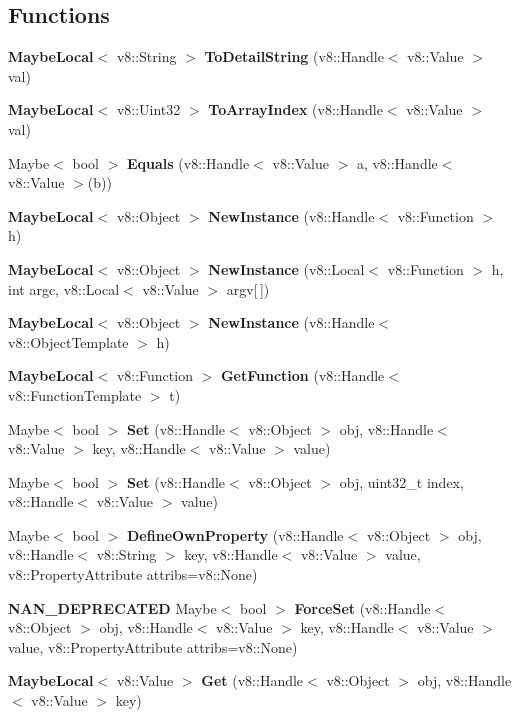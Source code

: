 \subsection*{Functions}
\begin{DoxyCompactItemize}
\item 
\textbf{ Maybe\+Local}$<$ v8\+::\+String $>$ \textbf{ To\+Detail\+String} (v8\+::\+Handle$<$ v8\+::\+Value $>$ val)
\item 
\textbf{ Maybe\+Local}$<$ v8\+::\+Uint32 $>$ \textbf{ To\+Array\+Index} (v8\+::\+Handle$<$ v8\+::\+Value $>$ val)
\item 
Maybe$<$ bool $>$ \textbf{ Equals} (v8\+::\+Handle$<$ v8\+::\+Value $>$ a, v8\+::\+Handle$<$ v8\+::\+Value $>$(b))
\item 
\textbf{ Maybe\+Local}$<$ v8\+::\+Object $>$ \textbf{ New\+Instance} (v8\+::\+Handle$<$ v8\+::\+Function $>$ h)
\item 
\textbf{ Maybe\+Local}$<$ v8\+::\+Object $>$ \textbf{ New\+Instance} (v8\+::\+Local$<$ v8\+::\+Function $>$ h, int argc, v8\+::\+Local$<$ v8\+::\+Value $>$ argv[$\,$])
\item 
\textbf{ Maybe\+Local}$<$ v8\+::\+Object $>$ \textbf{ New\+Instance} (v8\+::\+Handle$<$ v8\+::\+Object\+Template $>$ h)
\item 
\textbf{ Maybe\+Local}$<$ v8\+::\+Function $>$ \textbf{ Get\+Function} (v8\+::\+Handle$<$ v8\+::\+Function\+Template $>$ t)
\item 
Maybe$<$ bool $>$ \textbf{ Set} (v8\+::\+Handle$<$ v8\+::\+Object $>$ obj, v8\+::\+Handle$<$ v8\+::\+Value $>$ key, v8\+::\+Handle$<$ v8\+::\+Value $>$ value)
\item 
Maybe$<$ bool $>$ \textbf{ Set} (v8\+::\+Handle$<$ v8\+::\+Object $>$ obj, uint32\+\_\+t index, v8\+::\+Handle$<$ v8\+::\+Value $>$ value)
\item 
Maybe$<$ bool $>$ \textbf{ Define\+Own\+Property} (v8\+::\+Handle$<$ v8\+::\+Object $>$ obj, v8\+::\+Handle$<$ v8\+::\+String $>$ key, v8\+::\+Handle$<$ v8\+::\+Value $>$ value, v8\+::\+Property\+Attribute attribs=v8\+::\+None)
\item 
\textbf{ N\+A\+N\+\_\+\+D\+E\+P\+R\+E\+C\+A\+T\+ED} Maybe$<$ bool $>$ \textbf{ Force\+Set} (v8\+::\+Handle$<$ v8\+::\+Object $>$ obj, v8\+::\+Handle$<$ v8\+::\+Value $>$ key, v8\+::\+Handle$<$ v8\+::\+Value $>$ value, v8\+::\+Property\+Attribute attribs=v8\+::\+None)
\item 
\textbf{ Maybe\+Local}$<$ v8\+::\+Value $>$ \textbf{ Get} (v8\+::\+Handle$<$ v8\+::\+Object $>$ obj, v8\+::\+Handle$<$ v8\+::\+Value $>$ key)

\end{DoxyCompactItemize}
